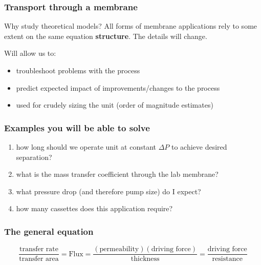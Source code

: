 \begin{frame}\frametitle{Transport through a membrane}
	\begin{exampleblock}{Why study theoretical models?}
		All forms of membrane applications rely to some extent on the same equation \textbf{structure}. The details will change.
	\end{exampleblock}

	\vspace{12pt}
	
	Will allow us to:
	\begin{itemize}
		\item	troubleshoot problems with the process
		\item	predict expected impact of improvements/changes to the process
		\item	used for crudely sizing the unit (order of magnitude estimates)
	\end{itemize}
	
\end{frame}

\begin{frame}\frametitle{Examples you will be able to solve}
	\begin{enumerate}
		\item	how long should we operate unit at constant \( \Delta P \) to achieve desired separation?
		\item	what is the mass transfer coefficient through the lab membrane?
		\item	what pressure drop (and therefore pump size) do I expect?
		\item	how many cassettes does this application require?
	\end{enumerate}
\end{frame}

\begin{frame}\frametitle{The general equation}
	\[
		\displaystyle \frac{\text{transfer rate}}{\text{transfer area}}  = \text{Flux} = \displaystyle \frac{(\text{permeability})(\text{driving force})}{\text{thickness}} = \displaystyle \frac{\text{driving force}}{\text{resistance}} 
	\]
\end{frame}

